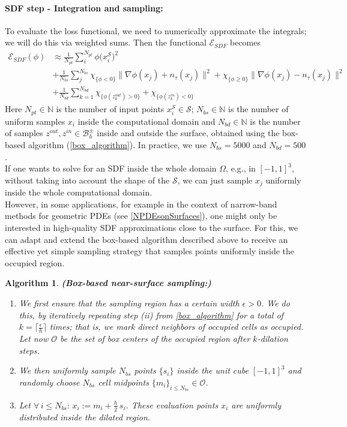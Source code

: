 \documentclass[12pt,openany]{book}
\def\S{\mathcal{S}}
\theoremstyle{plainnormal}
\newtheorem{algorithm}[theorem]{Algorithm}
\theoremstyle{remark}
\begin{document}
\paragraph{SDF step - Integration and sampling:} To evaluate the loss functional, we need to numerically approximate the integrals; we will do this via weighted sums. Then the functional $\mathcal{E}_{SDF}$ becomes
\begin{align*}
    \mathcal{E}_{SDF}(\phi) &\approx 
 \frac{1}{N_{pt}}\sum_i^{N_{pt}}\phi\big( x_i^\S\big)^2\\ &+ \frac{1}{N_{bs}}\sum_j^{N_{bs}}
\chi_{\{\phi < 0\}} \|\nabla \phi(x_j) + n_\tau(x_j)\|^2 + \chi_{\{\phi \geq 0\}} \|\nabla \phi(x_j) - n_\tau(x_j)\|^2  \\&+\frac{1}{N_{bd}} \sum^{N_{bd}}_{k = 1}\chi_{\{\phi(z^{out}_k) > 0\}} + \chi_{\{\phi(z^{in}_k) < 0\}}
\end{align*}
Here $N_{pt}\in \mathbb{N}$ is the number of input points $x_i^\S \in \mathcal S$;  $N_{bs}\in \mathbb{N}$ is the number of uniform samples $x_i$ inside the computational domain and $N_{bd}\in \mathbb{N}$ is the number of samples $z^{out}, z^{in} \in \mathcal{B}_h^\pm$ inside and outside the surface, obtained using the box-based algorithm (\cref{box_algorithm}). In practice, we use $N_{bs} = 5000$ and $N_{bd} = 500$.\\
If one wants to solve for an SDF inside the whole domain $\Omega$, e.g., in $[-1,1]^3$, without taking into account the shape of the $\S$, we can just sample $x_j$ uniformly inside the whole computational domain.\\
However, in some applications, for example in the context of narrow-band methods for geometric PDEs (see \cref{NPDEsonSurfaces}), one might only be interested in high-quality SDF approximations close to the surface. For this, we can adapt and extend the box-based algorithm described above to receive an effective yet simple sampling strategy that samples points uniformly inside the occupied region.
\begin{algorithm}\label{clever_sampling}\textbf{(Box-based near-surface sampling:)}
  \begin{enumerate}
      \item We first ensure that the sampling region has a certain width $\epsilon > 0$. We do this, by iteratively repeating step (ii) from \cref{box_algorithm} for a total of $k = \lceil \frac{\epsilon}{h} \rceil$ times; that is, we mark direct neighbors of occupied cells as occupied. Let now $\mathcal{O}$ be the set of box centers of the occupied region after $k$-dilation steps. 
      \item We then uniformly sample $N_{bs}$ points $\{s_i\}$ inside the unit cube $[-1,1]^3$ and randomly choose $N_{bs}$ cell midpoints $\{m_i\}_{i \leq N_{bs}} \in \mathcal O$.
      \item Let $\forall\, i \leq N_{bs}: \,x_i := m_i + \frac{h}{2}\,s_i$. These evaluation points $x_i$ are uniformly distributed inside the dilated region.
  \end{enumerate}  
\end{algorithm}
\end{document}
